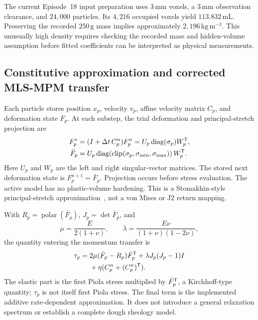 The current Episode~18 input preparation uses $3\,\mathrm{mm}$ voxels, a $3\,\mathrm{mm}$ observation clearance, and $24{,}000$ particles. Its $4{,}216$ occupied voxels yield $113.832\,\mathrm{mL}$. Preserving the recorded $250\,\mathrm{g}$ mass implies approximately $2{,}196\,\mathrm{kg\,m^{-3}}$. This unusually high density requires checking the recorded mass and hidden-volume assumption before fitted coefficients can be interpreted as physical measurements.

\subsection{Constitutive approximation and corrected MLS-MPM transfer}

Each particle stores position $x_p$, velocity $v_p$, affine velocity matrix $C_p$, and deformation state $F_p$. At each substep, the trial deformation and principal-stretch projection are
\begin{align}
 F_p^*&=(I+\Delta t\,C_p^n)F_p^n
       =U_p\operatorname{diag}(\sigma_p)W_p^{\mathsf{T}}, \\
 \bar F_p&=U_p\operatorname{diag}\!\left(
       \operatorname{clip}(\sigma_p,\sigma_{\min},\sigma_{\max})\right)W_p^{\mathsf{T}}.
 \label{eq:plastic}
\end{align}
Here $U_p$ and $W_p$ are the left and right singular-vector matrices. The stored next deformation state is $F_p^{n+1}=\bar F_p$. Projection occurs before stress evaluation. The active model has no plastic-volume hardening. This is a Stomakhin-style principal-stretch approximation~\cite{snow2013}, not a von Mises or J2 return mapping.

With $R_p=\operatorname{polar}(\bar F_p)$, $J_p=\det\bar F_p$, and
\begin{equation}
 \mu=\frac{E}{2(1+\nu)},\qquad
 \lambda=\frac{E\nu}{(1+\nu)(1-2\nu)},
\end{equation}
the quantity entering the momentum transfer is
\begin{equation}
 \begin{split}
 \tau_p={}&2\mu(\bar F_p-R_p)\bar F_p^{\mathsf{T}}
       +\lambda J_p(J_p-1)I\\
       &+\eta(C_p^n+(C_p^n)^{\mathsf{T}}).
 \end{split}
 \label{eq:stress}
\end{equation}
The elastic part is the first Piola stress multiplied by $\bar F_p^{\mathsf{T}}$, a Kirchhoff-type quantity; $\tau_p$ is not itself first Piola stress. The final term is the implemented additive rate-dependent approximation. It does not introduce a general relaxation spectrum or establish a complete dough rheology model.

